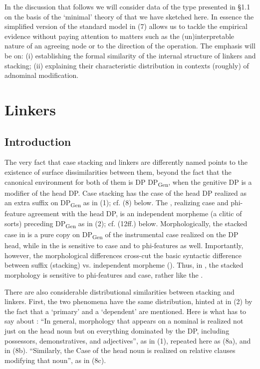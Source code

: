 \documentclass[output=paper]{langsci/langscibook}
\begin{document}
  In the discussion that follows we will consider data of the type presented in §1.1 on the basis of the ‘minimal’ theory of  that we have sketched here. In essence the simplified version of the standard model in (7) allows us to tackle the empirical evidence without paying attention to matters such as the (un)interpretable nature of an agreeing node or to the direction of the  operation. The emphasis will be on: (i) establishing the formal similarity of the internal structure of linkers and stacking; (ii) explaining their characteristic distribution in contexts (roughly) of adnominal modification.\largerpage[-4]

\section{Linkers} %

\subsection{Introduction}%

The very fact that case stacking and linkers are differently named points to the existence of surface dissimilarities between them, beyond the fact that the canonical environment for both of them is DP DP\textsubscript{Gen}, when the genitive DP is a modifier of the head DP. Case stacking has the case of the head DP realized as an extra suffix on DP\textsubscript{Gen} as in  (1); cf. (8) below. The , realizing case and phi-feature agreement with the head DP, is an independent morpheme (a clitic of sorts) preceding DP\textsubscript{Gen} as in  (2); cf. (12ff.) below. Morphologically, the stacked case in  is a pure copy on DP\textsubscript{Gen} of the instrumental case realized on the DP head, while in  the  is sensitive to case and to phi-features as well. Importantly, however, the morphological differences cross-cut the basic syntactic difference between suffix (stacking) vs. independent morpheme (). Thus, in , the stacked morphology is sensitive to phi-features and case, rather like the  .  

  There are also considerable distributional similarities between stacking and linkers. First, the two phenomena have the same distribution, hinted at in (2) by the fact that a ‘primary’ and a ‘dependent’ are mentioned. Here is what \citet[46--47]{Richards2013} has to say about : “In general, morphology that appears on a nominal is realized not just on the head noun but on everything dominated by the DP, including possessors, demonstratives, and adjectives”, as in (1), repeated here as (8a), and in (8b). “Similarly, the Case of the head noun is realized on relative clauses modifying that noun”, as in (8c).  
\end{document}
